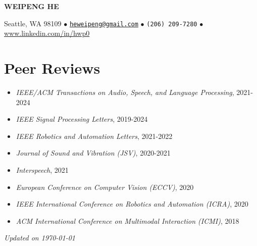\documentclass[a4paper,9pt]{extarticle} %
\begin{document}
\thispagestyle{empty}


\begin{center}
  {\Huge\bfseries\sffamily WEIPENG HE}

  Seattle, WA 98109 $\bullet$
  \href{mailto:heweipeng@gmail.com}{\texttt{heweipeng@gmail.com}} $\bullet$
  \texttt{(206) 209-7280} $\bullet$
  \url{www.linkedin.com/in/hwp0} 
\end{center}


\section{Peer Reviews}

\begin{itemize}[itemsep=-.9em]
  \item \textit{IEEE/ACM Transactions on Audio, Speech, and Language Processing}, 2021-2024
  \item \textit{IEEE Signal Processing Letters}, 2019-2024
  \item \textit{IEEE Robotics and Automation Letters}, 2021-2022
  \item \textit{Journal of Sound and Vibration (JSV)}, 2020-2021
  \item \textit{Interspeech}, 2021
  \item \textit{European Conference on Computer Vision (ECCV)}, 2020
  \item \textit{IEEE International Conference on Robotics and Automation (ICRA)}, 2020
  \item \textit{ACM International Conference on Multimodal Interaction (ICMI)}, 2018
\end{itemize}


\vfill
\centering \footnotesize \itshape{Updated on \today}
\end{document}
